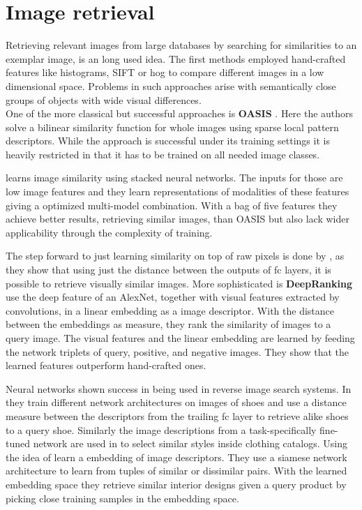 \section{Image retrieval}
\label{sec:related:retrieval}
Retrieving relevant images from large databases by searching for similarities to an exemplar image, is an long used idea. The first methods employed hand-crafted features like histograms, SIFT or \gls{hog} to compare different images in a low dimensional space. Problems in such approaches arise with semantically close groups of objects with wide visual differences.\\
One of the more classical but successful approaches is \textbf{OASIS} \citep{chechik_large_2010}. Here the authors solve a bilinear similarity function for whole images using sparse local pattern descriptors. While the approach is successful under its training settings it is heavily restricted in that it has to be trained on all needed image classes.

\citet{wu_online_2013} learns image similarity using stacked neural networks. The inputs for those are low image features and they learn representations of modalities of these features giving a optimized multi-model combination. With a bag of five features they achieve better results, retrieving similar images, than OASIS but also lack wider applicability through the complexity of training.

The step forward to just learning similarity on top of raw pixels is done by \citet{babenko_neural_2014}, as they show that using just the distance between  the outputs of \gls{fc} layers, it is possible to retrieve visually similar images. More sophisticated is \textbf{DeepRanking} \citep{wang_learning_2014} use the deep feature of an AlexNet, together with visual features extracted by convolutions, in a linear embedding as a image descriptor. With the distance between the embeddings as measure, they rank the similarity of images to a query image. The visual features and the linear embedding are learned by feeding the network triplets of query, positive, and negative images. They show that the learned features outperform hand-crafted ones.

Neural networks shown success in being used in reverse image search systems. In \citep{khosla_building_2015} they train different network architectures on images of shoes and use a distance measure between the descriptors from the trailing \gls{fc} layer to retrieve alike shoes to a query shoe. Similarly the image descriptions from a task-specifically fine-tuned network are used in \citep{chen_visual-based_2015} to select similar styles inside clothing catalogs. Using the idea of \citep{wang_learning_2014} \citet{bell_learning_2015} learn a embedding of image descriptors. They use a siamese network architecture to learn from tuples of similar or dissimilar pairs. With the learned embedding space they retrieve similar interior designs given a query product by picking close training samples in the embedding space.
